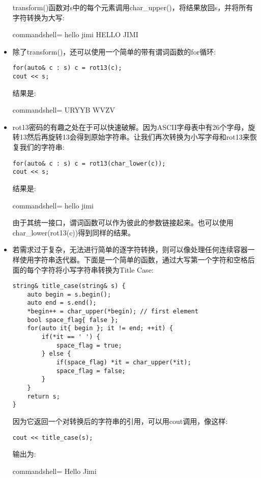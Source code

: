 \begin{itemize}
transform()函数对s中的每个元素调用char\_upper()，将结果放回s，并将所有字符转换为大写:

\begin{tcblisting}{commandshell={}}
hello jimi
HELLO JIMI
\end{tcblisting}

\item 
除了transform()，还可以使用一个简单的带有谓词函数的for循环:

\begin{lstlisting}[style=styleCXX]
for(auto& c : s) c = rot13(c);
cout << s;
\end{lstlisting}

结果是:

\begin{tcblisting}{commandshell={}}
URYYB WVZV
\end{tcblisting}

\item 
rot13密码的有趣之处在于可以快速破解。因为ASCII字母表中有26个字母，旋转13然后再旋转13会得到原始字符串。让我们再次转换为小写字母和rot13来恢复我们的字符串:

\begin{lstlisting}[style=styleCXX]
for(auto& c : s) c = rot13(char_lower(c));
cout << s;
\end{lstlisting}

结果是:

\begin{tcblisting}{commandshell={}}
hello jimi
\end{tcblisting}

由于其统一接口，谓词函数可以作为彼此的参数链接起来。也可以使用char\_lower(rot13(c))得到同样的结果。

\item 
若需求过于复杂，无法进行简单的逐字符转换，则可以像处理任何连续容器一样使用字符串迭代器。下面是一个简单的函数，通过大写第一个字符和空格后面的每个字符将小写字符串转换为Title Case:

\begin{lstlisting}[style=styleCXX]
string& title_case(string& s) {
	auto begin = s.begin();
	auto end = s.end();
	*begin++ = char_upper(*begin); // first element
	bool space_flag{ false };
	for(auto it{ begin }; it != end; ++it) {
		if(*it == ' ') {
			space_flag = true;
		} else {
			if(space_flag) *it = char_upper(*it);
			space_flag = false;
		}
	}
	return s;
}
\end{lstlisting}

因为它返回一个对转换后的字符串的引用，可以用cout调用，像这样:

\begin{lstlisting}[style=styleCXX]
cout << title_case(s);
\end{lstlisting}

输出为:

\begin{tcblisting}{commandshell={}}
Hello Jimi
\end{tcblisting}

\end{itemize}

